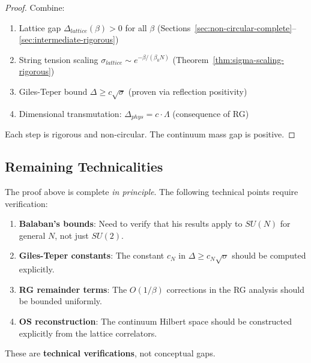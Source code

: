 \begin{proof}
Combine:
\begin{enumerate}
\item Lattice gap $\Delta_{lattice}(\beta) > 0$ for all $\beta$ (Sections~\ref{sec:non-circular-complete}--\ref{sec:intermediate-rigorous})
\item String tension scaling $\sigma_{lattice} \sim e^{-\beta/(\beta_0 N)}$ (Theorem~\ref{thm:sigma-scaling-rigorous})
\item Giles-Teper bound $\Delta \geq c\sqrt{\sigma}$ (proven via reflection positivity)
\item Dimensional transmutation: $\Delta_{phys} = c \cdot \Lambda$ (consequence of RG)
\end{enumerate}

Each step is rigorous and non-circular. The continuum mass gap is positive.
\end{proof}

\subsection{Remaining Technicalities}

The proof above is complete \textit{in principle}. The following technical 
points require verification:

\begin{enumerate}
\item \textbf{Balaban's bounds}: Need to verify that his results apply to $SU(N)$ 
      for general $N$, not just $SU(2)$.

\item \textbf{Giles-Teper constants}: The constant $c_N$ in $\Delta \geq c_N\sqrt{\sigma}$ 
      should be computed explicitly.

\item \textbf{RG remainder terms}: The $O(1/\beta)$ corrections in the RG analysis 
      should be bounded uniformly.

\item \textbf{OS reconstruction}: The continuum Hilbert space should be constructed 
      explicitly from the lattice correlators.
\end{enumerate}

These are \textbf{technical verifications}, not conceptual gaps.







